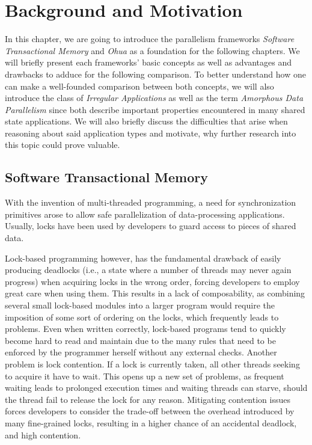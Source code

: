 %
\chapter{Background and Motivation}%
\label{sec:background}

In this chapter, we are going to introduce the parallelism frameworks \emph{Software Transactional Memory} and \emph{Ohua} as a foundation for the following chapters.
We will briefly present each frameworks' basic concepts as well as advantages and drawbacks to adduce for the following comparison.
To better understand how one can make a well-founded comparison between both concepts, we will also introduce the class of \emph{Irregular Applications} as well as the term \emph{Amorphous Data Parallelism} since both describe important properties encountered in many shared state applications.
We will also briefly discuss the difficulties that arise when reasoning about said application types and motivate, why further research into this topic could prove valuable.

\section{Software Transactional Memory}
\label{sec:background:stm}

With the invention of multi-threaded programming, a need for synchronization primitives arose to allow safe parallelization of data-processing applications.
Usually, locks have been used by developers to guard access to pieces of shared data.

Lock-based programming however, has the fundamental drawback of easily producing deadlocks (i.e., a state where a number of threads may never again progress) when acquiring locks in the wrong order, forcing developers to employ great care when using them.
This results in a lack of composability, as combining several small lock-based modules into a larger program would require the imposition of some sort of ordering on the locks, which frequently leads to problems.
Even when written correctly, lock-based programs tend to quickly become hard to read and maintain due to the many rules that need to be enforced by the programmer herself without any external checks.
Another problem is lock contention.
If a lock is currently taken, all other threads seeking to acquire it have to wait.
This opens up a new set of problems, as frequent waiting leads to prolonged execution times and waiting threads can starve, should the thread fail to release the lock for any reason.
Mitigating contention issues forces developers to consider the trade-off between the overhead introduced by many fine-grained locks, resulting in a higher chance of an accidental deadlock, and high contention.

